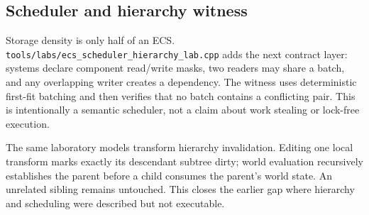 \subsection{Scheduler and hierarchy witness}\label{appendix-fbfeb0430008-scheduler-and-hierarchy-witness}

Storage density is only half of an ECS. \texttt{tools/labs/ecs\_scheduler\_hierarchy\_lab.cpp} adds the next contract layer: systems declare component read/write masks, two readers may share a batch, and any overlapping writer creates a dependency. The witness uses deterministic first-fit batching and then verifies that no batch contains a conflicting pair. This is intentionally a semantic scheduler, not a claim about work stealing or lock-free execution.

The same laboratory models transform hierarchy invalidation. Editing one local transform marks exactly its descendant subtree dirty; world evaluation recursively establishes the parent before a child consumes the parent's world state. An unrelated sibling remains untouched. This closes the earlier gap where hierarchy and scheduling were described but not executable.
